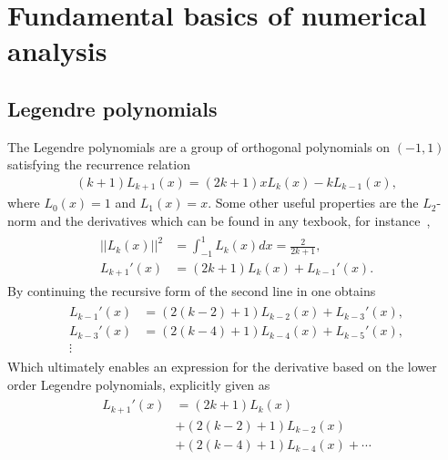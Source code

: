 
\chapter{Fundamental basics of numerical analysis} %

\label{AppendixA} %


\section{Legendre polynomials} \label{legpols}
The Legendre polynomials are a group of orthogonal polynomials on $(-1,1)$ satisfying the recurrence relation 
\begin{align}
    (k+1)L_{k+1}(x) = (2k+1)xL_{k}(x)-kL_{k-1}(x),
    \label{eq:Legendrerecursive}
\end{align}
where $L_0(x) = 1$ and $L_1(x) = x$. Some other useful properties are the $L_2$-norm and 
the derivatives which can be found in any texbook, for instance~\cite{Canuto},
\begin{align}
    \begin{split}
    ||L_k(x)||^2 &= \int_{-1}^1L_{k}(x)dx = \frac{2}{2k+1},  \\
    L_{k+1}'(x) &= (2k+1)L_k(x)+L_{k-1}'(x).
    \end{split}
    \label{eq:relations}
\end{align}
By continuing the recursive form of the second line in  one obtains
\begin{align}
    \begin{split}
    L_{k-1}'(x) &= (2(k-2)+1)L_{k-2}(x)+L_{k-3}'(x), \\
    L_{k-3}'(x) &= (2(k-4)+1)L_{k-4}(x)+L_{k-5}'(x), \\
    \vdots 
    \end{split}
    \label{eq:derivatives}
\end{align}
Which ultimately enables an expression for the derivative based on the lower order Legendre polynomials, explicitly given as 
\begin{align}
    \begin{split}
    L_{k+1}'(x) &= (2k+1)L_k(x)\\
    &+(2(k-2)+1)L_{k-2}(x)\\
    &+(2(k-4)+1)L_{k-4}(x)+\cdots 
    \end{split}
    \label{eq:der-explicit}
\end{align}
